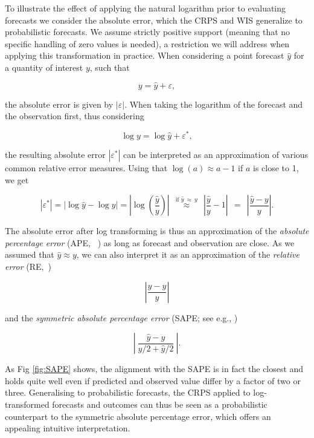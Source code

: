 \documentclass[10pt,letterpaper]{article}
\begin{document}
To illustrate the effect of applying the natural logarithm prior to evaluating forecasts we consider the absolute error, which the CRPS and WIS generalize to probabilistic forecasts. We assume strictly positive support (meaning that no specific handling of zero values is needed), a restriction we will address when applying this transformation in practice. When considering a point forecast $\hat{y}$ for a quantity of interest $y$, such that 
%
\begin{linenomath*}
\begin{equation}
y = \hat{y} + \varepsilon,
\end{equation}
\end{linenomath*}
the absolute error is given by $|\varepsilon|$. When taking the logarithm of the forecast and the observation first, thus considering 
\begin{linenomath*}
\begin{equation}
\log y = \log \hat{y} + \varepsilon^*,
\end{equation}
\end{linenomath*}
the resulting absolute error $\left|\varepsilon^*\right|$ can be interpreted as an approximation of various common relative error measures. Using that $\log(a) \approx a - 1$ if $a$ is close to 1, we get
\begin{linenomath*}
\begin{equation}
|\varepsilon^*| = |\log \hat{y} - \log y| = \left|\log\left(\frac{\hat{y}}{y}\right) \right| \ \ \stackrel{\text{if } \hat{y} \ \approx \ y}{\approx} \ \ \left| \frac{\hat{y}}{y} - 1 \right| \ \ = \ \ \left| \frac{\hat{y} - y}{y} \right|.
\end{equation}
\end{linenomath*}
The absolute error after log transforming is thus an approximation of the \textit{absolute percentage error} (APE,~ \cite{gneitingMakingEvaluatingPoint2011a}) as long as forecast and observation are close. As we assumed that $\hat{y} \approx y$, we can also interpret it as an approximation of the \textit{relative error} (RE,~\cite{gneitingMakingEvaluatingPoint2011a})
\begin{linenomath*}
\begin{equation}
\left| \frac{\hat{y} - y}{\hat{y}} \right|
\end{equation}
\end{linenomath*}
and the \textit{symmetric absolute percentage error} (SAPE; see e.g., \cite{Flores1986})
\begin{linenomath*}
\begin{equation}
\left| \ \frac{\hat{y} - y}{y/2 + \hat{y}/2} \ \right|.
\end{equation}
\end{linenomath*}
As Fig \ref{fig:SAPE} shows, the alignment with the SAPE is in fact the closest and holds quite well even if predicted and observed value differ by a factor of two or three. Generalising to probabilistic forecasts, the CRPS applied to log-transformed forecasts and outcomes can thus be seen as a probabilistic counterpart to the symmetric absolute percentage error, which offers an appealing intuitive interpretation.
\end{document}
